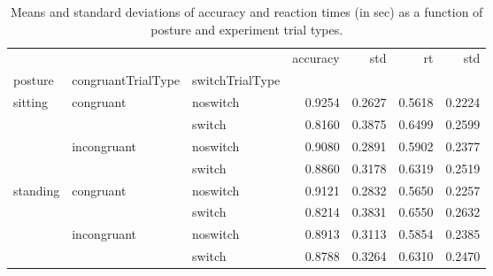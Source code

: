 \begin{table}
\centering
\caption{Means and standard deviations of accuracy and reaction times (in sec) as a function of posture and experiment trial types.}
\label{table-task-switching-replication-reaction-time}
\begin{tabular}{lllrrrr}
\toprule
         &             &        & accuracy &    std &     rt &    std \\
posture & congruantTrialType & switchTrialType &          &        &        &        \\
\midrule
sitting & congruant & noswitch &   0.9254 & 0.2627 & 0.5618 & 0.2224 \\
         &             & switch &   0.8160 & 0.3875 & 0.6499 & 0.2599 \\
         & incongruant & noswitch &   0.9080 & 0.2891 & 0.5902 & 0.2377 \\
         &             & switch &   0.8860 & 0.3178 & 0.6319 & 0.2519 \\
standing & congruant & noswitch &   0.9121 & 0.2832 & 0.5650 & 0.2257 \\
         &             & switch &   0.8214 & 0.3831 & 0.6550 & 0.2632 \\
         & incongruant & noswitch &   0.8913 & 0.3113 & 0.5854 & 0.2385 \\
         &             & switch &   0.8788 & 0.3264 & 0.6310 & 0.2470 \\
\bottomrule
\end{tabular}
\end{table}
